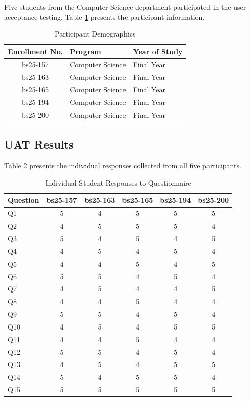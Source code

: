 \documentclass[12pt,a4paper]{report}
\begin{document}
Five students from the Computer Science department participated in the user acceptance testing. Table \ref{tab:participants} presents the participant information.

\vspace{0.3cm}

\begin{table}[h]
\centering
\begin{tabular}{|c|l|l|}
\hline
\textbf{Enrollment No. } & \textbf{Program} & \textbf{Year of Study} \\
\hline
bs25-157 & Computer Science & Final Year \\
\hline
bs25-163 & Computer Science & Final Year \\
\hline
bs25-165 & Computer Science & Final Year \\
\hline
bs25-194 & Computer Science & Final Year \\
\hline
bs25-200 & Computer Science & Final Year \\
\hline
\end{tabular}
\caption{Participant Demographics}
\label{tab:participants}
\end{table}

\subsection{UAT Results}

Table \ref{tab:uatresults} presents the individual responses collected from all five participants.

\vspace{0.3cm}

\begin{table}[h]
\centering
\small
\begin{tabular}{|l|c|c|c|c|c|}
\hline
\textbf{Question} & \textbf{bs25-157} & \textbf{bs25-163} & \textbf{bs25-165} & \textbf{bs25-194} & \textbf{bs25-200} \\
\hline
Q1 & 5 & 4 & 5 & 5 & 5 \\
\hline
Q2 & 4 & 5 & 5 & 5 & 4 \\
\hline
Q3 & 5 & 4 & 5 & 4 & 5 \\
\hline
Q4 & 4 & 5 & 4 & 5 & 4 \\
\hline
Q5 & 4 & 4 & 5 & 4 & 5 \\
\hline
Q6 & 5 & 5 & 4 & 5 & 4 \\
\hline
Q7 & 4 & 5 & 4 & 4 & 5 \\
\hline
Q8 & 4 & 4 & 5 & 4 & 4 \\
\hline
Q9 & 5 & 5 & 4 & 5 & 4 \\
\hline
Q10 & 4 & 5 & 4 & 5 & 5 \\
\hline
Q11 & 4 & 4 & 5 & 4 & 4 \\
\hline
Q12 & 5 & 5 & 4 & 5 & 4 \\
\hline
Q13 & 4 & 5 & 4 & 5 & 5 \\
\hline
Q14 & 5 & 4 & 5 & 5 & 4 \\
\hline
Q15 & 5 & 5 & 5 & 5 & 5 \\
\hline
\end{tabular}
\caption{Individual Student Responses to Questionnaire}
\label{tab:uatresults}
\end{table}
\end{document}
